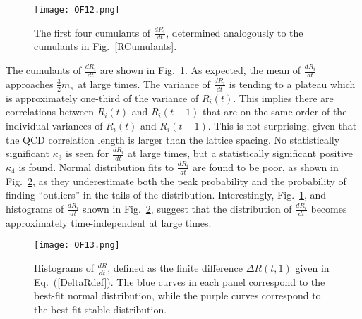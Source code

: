 \begin{figure}[!ht]
  \centering
  \texttt{[image: OF12.png]}
  \caption{
    The first four cumulants of $\frac{dR_i}{dt}$, determined analogously to the cumulants in Fig.~\ref{RCumulants}.
  }
  \label{dRdtCumulants}
\end{figure}
%
The cumulants of $\frac{dR_i}{dt}$ are shown in Fig.~\ref{dRdtCumulants}.  
As expected, the mean of $\frac{dR_i}{dt}$  approaches $\frac{3}{2}m_\pi$ at large times. 
The variance of $\frac{dR_i}{dt}$ is tending to a plateau which is approximately one-third of the variance of $R_i(t)$. 
This implies there are  correlations between $R_i(t)$ and $R_i(t-1)$ that are on the same order of the individual variances 
of $R_i(t)$ and $R_i(t-1)$. 
This is not surprising, given that the QCD correlation length is larger than the lattice spacing. 
No statistically significant $\kappa_3$ is seen for $\frac{dR_i}{dt}$ at large times, but a statistically significant positive $\kappa_4$ is found. 
Normal distribution fits to $\frac{dR_i}{dt}$ are found to be poor, as  shown in Fig.~\ref{dRdtHistograms}, as they 
underestimate both the peak probability and the probability of finding ``outliers'' in the tails of the distribution. 
Interestingly, 
Fig.~\ref{dRdtCumulants}, and histograms of $\frac{dR_i}{dt}$ shown in Fig.~\ref{dRdtHistograms},
suggest that the distribution of $\frac{dR_i}{dt}$ becomes approximately time-independent at large times.
%
\begin{figure}[!ht]
  \centering
  \texttt{[image: OF13.png]}
  \caption{
  Histograms of $\frac{dR}{dt}$, defined as the finite difference $\Delta R(t, 1)$ given in Eq.~(\ref{DeltaRdef}). 
  The blue curves in each panel correspond to the best-fit normal distribution, while the purple curves correspond to the best-fit 
  stable distribution.
  }
  \label{dRdtHistograms}
\end{figure}




